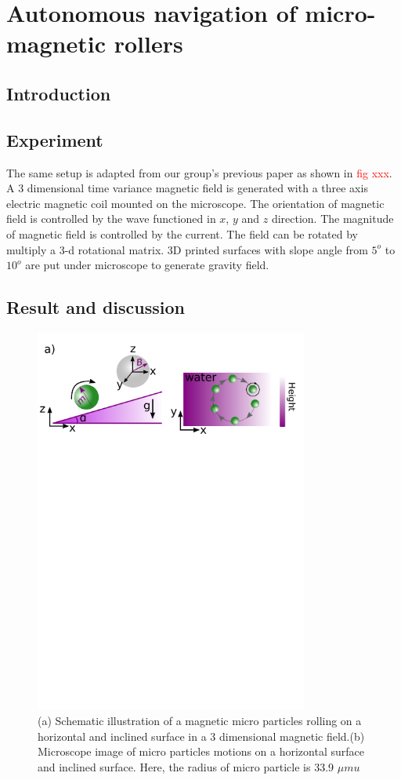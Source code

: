 \chapter{Autonomous navigation of micro-magnetic rollers} 
\section{Introduction}


\section{Experiment}
The same setup is adapted from our group's previous paper as shown in \textcolor{red}{fig xxx}. \cite{fei2018magneto, fei2019magneto} A 3 dimensional time variance magnetic field is generated with a three axis electric magnetic coil mounted on the microscope. The orientation of magnetic field is controlled by the wave functioned in $x$, $y$ and $z$ direction. The magnitude of magnetic field is controlled by the current. The field can be rotated by multiply a 3-d rotational matrix. 3D printed  surfaces with slope angle from $5^o$ to  $10^o$ are put under microscope to generate gravity field. 
\section{Result and discussion}
\begin{figure}[p]
\centering
\includegraphics[width=9cm]{figures/5_1.pdf}
\caption{ (a) Schematic illustration of a magnetic micro particles rolling on a horizontal and inclined surface in a 3 dimensional magnetic field.(b) Microscope image of  micro particles motions on a horizontal surface and inclined surface. Here, the radius of micro particle is 33.9 $\mu mu$ }
\label{fig:1}
\end{figure}
